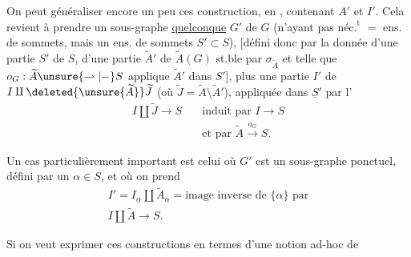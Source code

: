 On peut généraliser encore un peu ces construction, en    , contenant $A'$ et $I'$. Cela revient à prendre un sous-graphe \uline{quelconque} $G'$ de $G$ (n'ayant pas $\text{néc.}^{\text{t}}$  $=$ ens. de sommets, mais un ens. de sommets $S'\subset S$), [défini donc par la donnée d'une partie $S'$ de $S$, d'une partie $\widetilde A'$ de $\widetilde A(G)$ st.ble par $\sigma_{\widetilde A}$ et telle que $o_G:\widetilde A\unsure{\rightharpoonup|{-}}S$ applique $\widetilde A'$ dans $S'$], plus une partie $I'$ de $I\amalg\deleted{\unsure{\widetilde A}}\widetilde J$ (où $\widetilde J=\widetilde A\setminus\widetilde A'$), appliquée dans $\underline{S}'$ par l'
\[
\begin{aligned}
I\amalg\widetilde J\longrightarrow S\quad &\text{induit par }I\longrightarrow S\\
&\text{et par }\widetilde A\xrightarrow{o_G}S.
\end{aligned}
\]

Un cas particulièrement important est celui où $G'$ est un sous-graphe ponctuel, défini par un $\alpha\in S$,  et où on prend
\[
\begin{gathered}
I'=I_\alpha\amalg\widetilde A_\alpha=\text{image inverse de }\{\alpha\}\text{ par}\\
I\amalg\widetilde A\longrightarrow S.
\end{gathered}
\]

Si on veut exprimer ces constructions en termes d'une notion ad-hoc de

